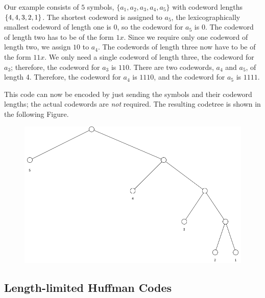 Our example consists of $5$ symbols, $\{a_1, a_2, a_3, a_4, a_5\}$ with codeword lengths $\{4,4,3,2 \\,1\}$. The shortest codeword is assigned to $a_5$, the lexicographically smallest codeword of length one is $0$, so the codeword for $a_5$ is $0$. The codeword of length two has to be of the form $1x$. Since we require only one codeword of length two, we assign $10$ to $a_4$. The codewords of length three now have to be of the form $11x$. We only need a single codeword of length three, the codeword for $a_3$; therefore, the codeword for $a_3$ is $110$. There are two codewords, $a_4$ and $a_5$, of length 4. Therefore, the codeword for $a_4$ is $1110$, and the codeword for $a_5$ is $1111$.

This code can now be encoded by just sending the symbols and their codeword lengths; the actual codewords are \emph{not} required. The resulting codetree is shown in the following Figure.

\begin{figure}[H]
    \centering
    \includegraphics[scale=0.4]{images/2021-05-03_tree_03.png}
\end{figure}


\subsection{Length-limited Huffman Codes}



